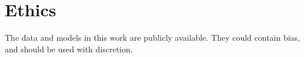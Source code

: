 \documentclass[11pt]{article}
\newcommand{\td}[1]{\textcolor{blue}{[{SP: #1}]}}
\begin{document}

\noindent

\section*{Ethics}
The data and models in this work are publicly
available. They could contain bias, and should be
used with discretion.



\end{document}
